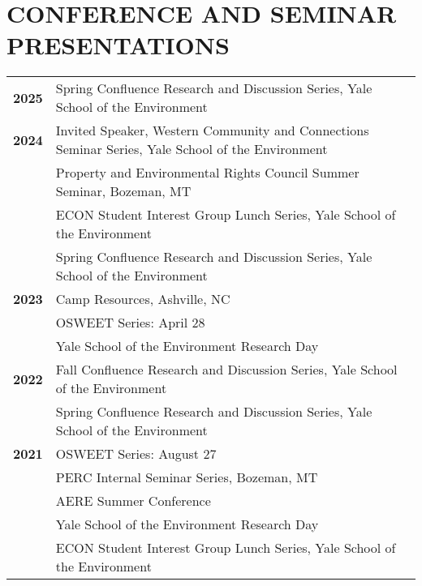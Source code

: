 \documentclass[11pt]{article}
\begin{document}
\section*{CONFERENCE AND SEMINAR PRESENTATIONS}
\begin{tabularx}{\linewidth}{>{\bfseries}r X} %
2025 & Spring Confluence Research and Discussion Series, Yale School of the Environment \\[1ex]
2024 & Invited Speaker, Western Community and Connections Seminar Series, Yale School of the Environment \\
    & Property and Environmental Rights Council Summer Seminar, Bozeman, MT \\
    & ECON Student Interest Group Lunch Series, Yale School of the Environment \\
    & Spring Confluence Research and Discussion Series, Yale School of the Environment \\[1ex]
2023 & Camp Resources, Ashville, NC \\
    & OSWEET Series: April 28 \\
    & Yale School of the Environment Research Day \\[1ex]
2022 & Fall Confluence Research and Discussion Series, Yale School of the Environment \\
    & Spring Confluence Research and Discussion Series, Yale School of the Environment \\[1ex]
2021 & OSWEET Series: August 27 \\
    & PERC Internal Seminar Series, Bozeman, MT \\
    & AERE Summer Conference \\
    & Yale School of the Environment Research Day \\
    & ECON Student Interest Group Lunch Series, Yale School of the Environment
\end{tabularx}
\end{document}
